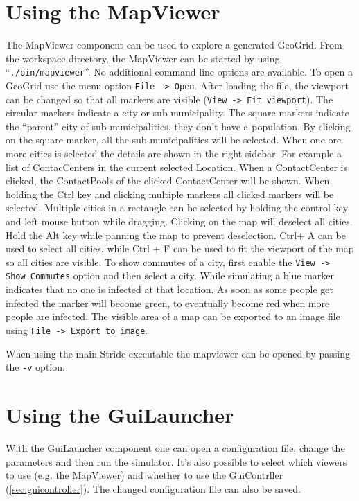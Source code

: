 \section{Using the MapViewer}

The MapViewer component can be used to explore a generated GeoGrid.
From the workspace directory, the MapViewer can be started by using \mbox{``\texttt{./bin/mapviewer}''}. No additional command line options are available.
To open a GeoGrid use the menu option \texttt{File -> Open}. After loading the file, the viewport can be changed so that all markers are visible (\texttt{View -> Fit viewport}).
The circular markers indicate a city or sub-municipality. The square markers indicate the ``parent'' city of sub-municipalities, they don't have a population.
By clicking on the square marker, all the sub-municipalities will be selected.
When one ore more cities is selected the details are shown in the right sidebar. For example a list of ContacCenters in the current selected Location. When a ContactCenter is clicked, the ContactPools of the clicked ContactCenter will be shown.
When holding the Ctrl key and clicking multiple markers all clicked markers will be selected.  Multiple cities in a rectangle can be selected by holding the control key and left mouse button while dragging. Clicking on the map will deselect all cities. Hold the Alt key while panning the map to prevent deselection.
Ctrl+ A can be used to select all cities, while Ctrl + F can be used to fit the viewport of the map so all cities are visible.
To show commutes of a city, first enable the \texttt{View -> Show Commutes} option and then select a city.
While simulating a blue marker indicates that no one is infected at that location. As soon as some people get infected the marker will become green, to eventually become red when more people are infected.
The visible area of a map can be exported to an image file using \texttt{File -> Export to image}.

When using the main Stride executable the mapviewer can be opened by passing the \texttt{-v} option.

\section{Using the GuiLauncher}

With the GuiLauncher component one can open a configuration file, change the parameters and then run the simulator. It's also possible to select which viewers to use (e.g. the MapViewer) and whether to use the GuiContrller (\ref{sec:guicontroller}). The changed configuration file can also be saved.

